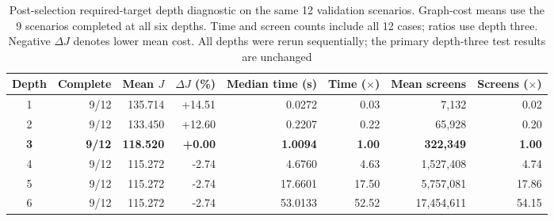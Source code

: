\begin{table}[t]
  \centering
  \caption{Post-selection required-target depth diagnostic on the same 12 validation scenarios. Graph-cost means use the 9 scenarios completed at all six depths. Time and screen counts include all 12 cases; ratios use depth three. Negative $\Delta J$ denotes lower mean cost. All depths were rerun sequentially; the primary depth-three test results are unchanged}
  \label{tab:depth-sensitivity}
  \renewcommand{\arraystretch}{1.08}
  \setlength{\tabcolsep}{5pt}
  \footnotesize
  \begin{tabular}{@{}crrrrrrr@{}}
    \toprule
    Depth & Complete & Mean $J$ & $\Delta J$ (\%) & Median time (s) & Time ($\times$) & Mean screens & Screens ($\times$) \\
    \midrule
    1 & 9/12 & 135.714 & +14.51 & 0.0272 & 0.03 & 7,132 & 0.02 \\
    2 & 9/12 & 133.450 & +12.60 & 0.2207 & 0.22 & 65,928 & 0.20 \\
    \textbf{3} & \textbf{9/12} & \textbf{118.520} & \textbf{+0.00} & \textbf{1.0094} & \textbf{1.00} & \textbf{322,349} & \textbf{1.00} \\
    4 & 9/12 & 115.272 & -2.74 & 4.6760 & 4.63 & 1,527,408 & 4.74 \\
    5 & 9/12 & 115.272 & -2.74 & 17.6601 & 17.50 & 5,757,081 & 17.86 \\
    6 & 9/12 & 115.272 & -2.74 & 53.0133 & 52.52 & 17,454,611 & 54.15 \\
    \bottomrule
  \end{tabular}
\end{table}
